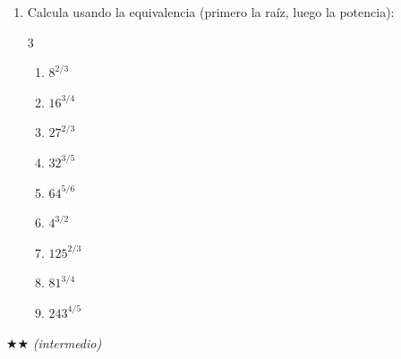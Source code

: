 \documentclass[11pt, letterpaper]{article}
\begin{document}
\begin{enumerate}[label=\textbf{\arabic*.}, leftmargin=*]
  \item Calcula usando la equivalencia (primero la raíz, luego la potencia):
  \begin{multicols}{3}
  \begin{enumerate}[label=\alph*)]
    \item $8^{2/3}$
    \item $16^{3/4}$
    \item $27^{2/3}$
    \item $32^{3/5}$
    \item $64^{5/6}$
    \item $4^{3/2}$
    \item $125^{2/3}$
    \item $81^{3/4}$
    \item $243^{4/5}$
  \end{enumerate}
  \end{multicols}
\end{enumerate}

$\bigstar\bigstar$ \textit{(intermedio)}
\end{document}
